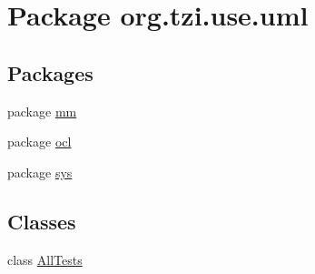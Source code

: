 \hypertarget{namespaceorg_1_1tzi_1_1use_1_1uml}{\section{Package org.\-tzi.\-use.\-uml}
\label{namespaceorg_1_1tzi_1_1use_1_1uml}
}
\subsection*{Packages}
\begin{DoxyCompactItemize}
\item 
package \hyperlink{namespaceorg_1_1tzi_1_1use_1_1uml_1_1mm}{mm}
\item 
package \hyperlink{namespaceorg_1_1tzi_1_1use_1_1uml_1_1ocl}{ocl}
\item 
package \hyperlink{namespaceorg_1_1tzi_1_1use_1_1uml_1_1sys}{sys}
\end{DoxyCompactItemize}
\subsection*{Classes}
\begin{DoxyCompactItemize}
\item 
class \hyperlink{classorg_1_1tzi_1_1use_1_1uml_1_1_all_tests}{All\-Tests}
\end{DoxyCompactItemize}

